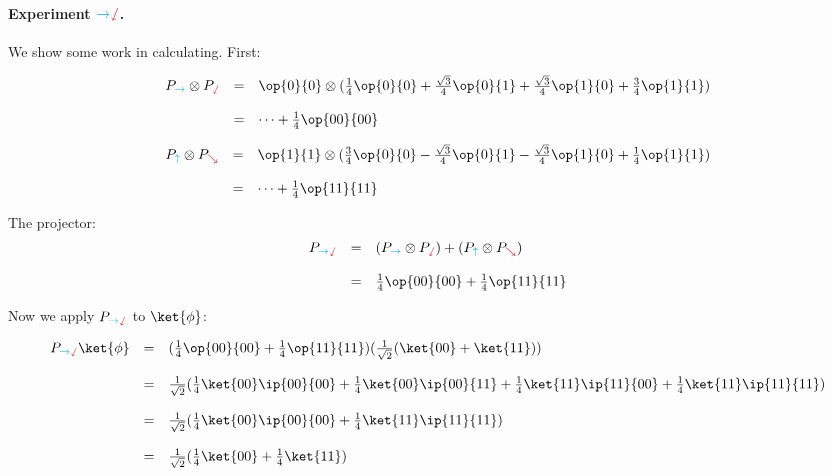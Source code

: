 \documentclass{article}
\newcommand{\xplus}{{\color{cyan}\rightarrow}}
\newcommand{\xminus}{{\color{cyan}\uparrow}}
\newcommand{\zplus}{{\color{red}\sswarrow}}
\newcommand{\zminus}{{\color{red}\searrow}}
\theoremstyle{remark}
\def\srtt{\frac{1}{\sqrt{2}}}
\begin{document}
\paragraph*{Experiment $\xplus\zplus$.} 
We show some work in calculating. First:

\[
    \begin{array}{rcl}
    P_{\xplus}\otimes P_{\zplus}
        &=& \op{0}{0}  
             \otimes 
            (\frac{1}{4} \op{0}{0} 
                + \frac{\sqrt{3}}{4} \op{0}{1} 
                + \frac{\sqrt{3}}{4} \op{1}{0} 
                + \frac{3}{4} \op{1}{1})
        \\ \\
        &=& \dots + \frac{1}{4}\op{00}{00} 
    \end{array}
\]

\[
    \begin{array}{rcl}
    P_{\xminus}\otimes P_{\zminus}
        &=& \op{1}{1}
            \otimes 
          (\frac{3}{4} \op{0}{0} 
            - \frac{\sqrt{3}}{4} \op{0}{1} 
            - \frac{\sqrt{3}}{4} \op{1}{0} 
            + \frac{1}{4} \op{1}{1})
            \\ \\
        &=& \dots + \frac{1}{4}\op{11}{11} 
    \end{array}
\]


The projector:
\[
    \begin{array}{rcl}
        P_{\xplus\zplus} 
        &=& (P_{\xplus}\otimes P_{\zplus}) + (P_{\xminus} \otimes P_{\zminus}) 
        \\ \\
        &=& \frac{1}{4}\op{00}{00} + \frac{1}{4}\op{11}{11}
    \end{array}
\]

Now we apply $P_{\xplus\zplus}$ to $\ket{\phi}$:

\[
    \begin{array}{rcl}
        P_{\xplus\zplus}\ket{\phi} &=& 
        (\frac{1}{4}\op{00}{00} + \frac{1}{4}\op{11}{11})(\srtt(\ket{00} + \ket{11}))
        \\ \\
        &=&
        \srtt(\frac{1}{4}\ket{00}\ip{00}{00} 
        + \frac{1}{4}\ket{00}\ip{00}{11} 
        + \frac{1}{4}\ket{11}\ip{11}{00}
        + \frac{1}{4}\ket{11}\ip{11}{11})
        \\ \\
        &=& 
        \srtt(\frac{1}{4}\ket{00}\ip{00}{00} + \frac{1}{4}\ket{11}\ip{11}{11})
        \\ \\
        &=& 
        \srtt(\frac{1}{4}\ket{00} + \frac{1}{4}\ket{11})
        \\ \\
    \end{array}
\]
\end{document}

